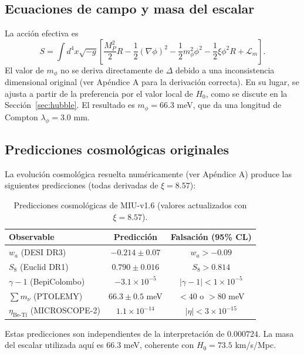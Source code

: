 \documentclass[12pt, a4paper]{article}
\theoremstyle{miuThm}
\theoremstyle{remark}
\newcommand{\eps}{0.000724}
\begin{document}
\subsection{Ecuaciones de campo y masa del escalar}
La acción efectiva es
\begin{equation}
S = \int d^4x\sqrt{-g}\left[ \frac{M_P^2}{2}R - \frac12(\nabla\phi)^2 - \frac12 m_\phi^2\phi^2 - \frac12\xi\phi^2 R + \mathcal{L}_m \right].
\end{equation}
El valor de $m_\phi$ no se deriva directamente de $\Delta$ debido a una inconsistencia dimensional original (ver Apéndice A para la derivación correcta). En su lugar, se ajusta a partir de la preferencia por el valor local de $H_0$, como se discute en la Sección~\ref{sec:hubble}. El resultado es $m_\phi = 66.3$ meV, que da una longitud de Compton $\lambda_\phi = 3.0$ mm.

\subsection{Predicciones cosmológicas originales}
La evolución cosmológica resuelta numéricamente (ver Apéndice A) produce las siguientes predicciones (todas derivadas de $\xi=8.57$):

\begin{table}[h!]
\centering
\caption{Predicciones cosmológicas de MIU-v1.6 (valores actualizados con $\xi=8.57$).}
\label{tab:cosmo_pred}
\begin{tabular}{lcc}
\toprule
\textbf{Observable} & \textbf{Predicción} & \textbf{Falsación (95\% CL)} \\
\midrule
$w_a$ (DESI DR3) & $-0.214 \pm 0.07$ & $w_a > -0.09$ \\
$S_8$ (Euclid DR1) & $0.790 \pm 0.016$ & $S_8 > 0.814$ \\
$\gamma-1$ (BepiColombo) & $-3.1\times10^{-5}$ & $|\gamma-1| < 1\times10^{-5}$ \\
$\sum m_\nu$ (PTOLEMY) & $66.3 \pm 0.5$ meV & $<40$ o $>80$ meV \\
$\eta_{\text{Be-Ti}}$ (MICROSCOPE-2) & $1.1\times10^{-14}$ & $|\eta| < 3\times10^{-15}$ \\
\bottomrule
\end{tabular}
\end{table}

Estas predicciones son independientes de la interpretación de $\eps$. La masa del escalar utilizada aquí es $66.3$ meV, coherente con $H_0=73.5$ km/s/Mpc.

\clearpage
\end{document}
